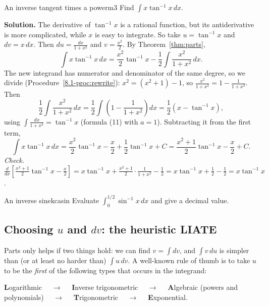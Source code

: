 \documentclass[11pt]{article}
\begin{document}
\begin{exmp}{An inverse tangent times a power}{m3}
Find $\int x\tan^{-1}x\,dx$.

\textbf{Solution.} The derivative of $\tan^{-1}x$ is a rational function, but its antiderivative is more complicated, while $x$ is easy to integrate. So take $u=\tan^{-1}x$ and $dv=x\,dx$. Then $du=\frac{dx}{1+x^2}$ and $v=\frac{x^2}2$. By Theorem~\ref{thm:parts},
\[\int x\tan^{-1}x\,dx=\frac{x^2}2\tan^{-1}x-\frac12\int\frac{x^2}{1+x^2}\,dx .\]
The new integrand has numerator and denominator of the same degree, so we divide (Procedure~\ref{8.1-proc:rewrite}): $x^2=(x^2+1)-1$, so $\frac{x^2}{1+x^2}=1-\frac1{1+x^2}$. Then
\[\frac12\int\frac{x^2}{1+x^2}\,dx=\frac12\int\left(1-\frac1{1+x^2}\right)dx=\frac12\left(x-\tan^{-1}x\right),\]
using $\int\frac{dx}{1+x^2}=\tan^{-1}x$ (formula (11) with $a=1$). Subtracting it from the first term,
\[\int x\tan^{-1}x\,dx=\frac{x^2}2\tan^{-1}x-\frac x2+\frac12\tan^{-1}x+C=\frac{x^2+1}2\tan^{-1}x-\frac x2+C .\]
\emph{Check.} $\frac{d}{dx}\left[\frac{x^2+1}2\tan^{-1}x-\frac x2\right]=x\tan^{-1}x+\frac{x^2+1}2\cdot\frac1{1+x^2}-\frac12=x\tan^{-1}x+\frac12-\frac12=x\tan^{-1}x$.
\end{exmp}

\begin{kc}{An inverse sine}{kcasin}
Evaluate $\int_0^{1/2}\sin^{-1}x\,dx$ and give a decimal value.
\end{kc}

\subsection*{Choosing $u$ and $dv$: the heuristic LIATE}

Parts only helps if two things hold: we can find $v=\int dv$, and $\int v\,du$ is simpler than (or at least no harder than) $\int u\,dv$. A well-known rule of thumb is to take $u$ to be the \emph{first} of the following types that occurs in the integrand:

\begin{center}
\textbf{L}ogarithmic \ \ $\to$ \ \ \textbf{I}nverse trigonometric \ \ $\to$ \ \ \textbf{A}lgebraic (powers and polynomials) \ \ $\to$ \ \ \textbf{T}rigonometric \ \ $\to$ \ \ \textbf{E}xponential.
\end{center}
\end{document}

